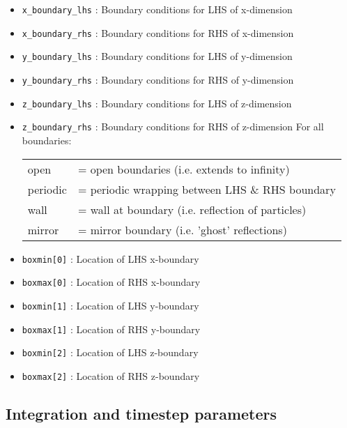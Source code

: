\documentclass[a4paper]{article}
\newcommand{\var}[1]{\texttt{#1}}
\begin{document}
\begin{itemize}

\item \var{x\_boundary\_lhs} : Boundary conditions for LHS of x-dimension
\item \var{x\_boundary\_rhs} : Boundary conditions for RHS of x-dimension
\item \var{y\_boundary\_lhs} : Boundary conditions for LHS of y-dimension
\item \var{y\_boundary\_rhs} : Boundary conditions for RHS of y-dimension
\item \var{z\_boundary\_lhs} : Boundary conditions for LHS of z-dimension
\item \var{z\_boundary\_rhs} : Boundary conditions for RHS of z-dimension
For all boundaries: \\
\begin{tabular}{ll}
open     & = open boundaries (i.e. extends to infinity) \\
periodic & = periodic wrapping between LHS \& RHS boundary \\
wall     & = wall at boundary (i.e. reflection of particles) \\
mirror   & = mirror boundary (i.e. 'ghost' reflections)
\end{tabular}

\item \var{boxmin[0]} : Location of LHS x-boundary
\item \var{boxmax[0]} : Location of RHS x-boundary
\item \var{boxmin[1]} : Location of LHS y-boundary
\item \var{boxmax[1]} : Location of RHS y-boundary
\item \var{boxmin[2]} : Location of LHS z-boundary
\item \var{boxmax[2]} : Location of RHS z-boundary


\end{itemize}


\subsection{Integration and timestep parameters}
\end{document}

